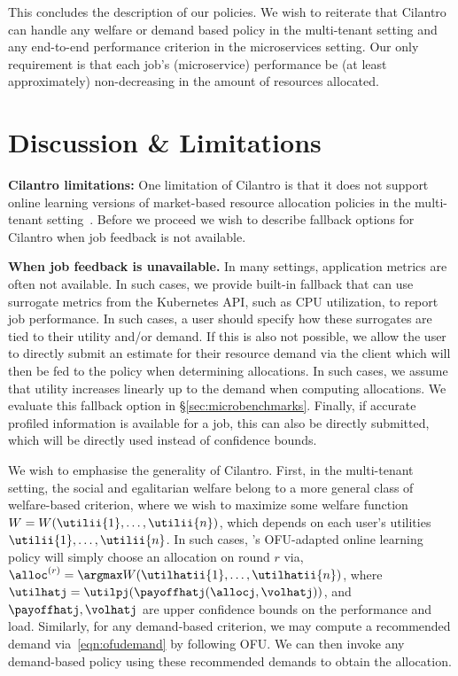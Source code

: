 

This concludes the description of our policies.
We wish to reiterate that Cilantro can handle any welfare or demand based policy in the multi-tenant
setting and any end-to-end performance criterion in the microservices setting.
Our only requirement is that each job's (microservice) performance be
(at least approximately) non-decreasing in the amount
of resources allocated.

\section{Discussion \& Limitations}
\label{sec:discussion}


\textbf{Cilantro limitations:}
One limitation of Cilantro is that it
does not support online learning versions of market-based resource allocation
policies in the multi-tenant setting~\citep{zahedi2018amdahl,lai2005tycoon,varian1973equity}.
Before we proceed we wish to describe fallback options for Cilantro when job feedback is not
available.


\textbf{When job feedback is unavailable.}
In many settings, application metrics are often not available. In such cases,
we provide built-in fallback
that can use surrogate metrics from the Kubernetes API, such as CPU utilization, to report job
performance.
In such cases, a user should specify how these surrogates are tied to their utility
and/or demand.
If this is also not possible, we allow the user to directly submit an estimate for their resource
demand via the client which will then be fed to the policy when determining allocations.
In such cases, we assume that utility increases linearly up to the demand when computing
allocations.
We evaluate this fallback option in \S\ref{sec:microbenchmarks}.
Finally, if accurate profiled information is available for a job,
this can also be directly submitted, which will be directly used instead of confidence bounds.


We wish to emphasise the generality of Cilantro.
First, in the multi-tenant setting,
the social and egalitarian welfare belong to a more general class of
welfare-based criterion, where we wish to maximize some welfare function
$W = W(\utilii{1},\dots,\utilii{n})$,
which depends on each user's utilities $\utilii{1},\dots,\utilii{n}$.
In such cases, \cilantro's OFU-adapted online learning policy will simply choose an
allocation on round $r$ via, $\alloc^{(r)}= \argmax W(\utilhatii{1},\dots,\utilhatii{n})$,
where
$\utilhatj = \utilpj(\payoffhatj(\allocj, \volhatj))$,
and $\payoffhatj, \volhatj$ are upper confidence bounds on the performance and load.
Similarly,
for any demand-based criterion, 
we may compute a recommended demand via~\eqref{eqn:ofudemand} by following OFU.
We can then invoke any
demand-based policy using these recommended demands to obtain the allocation.

